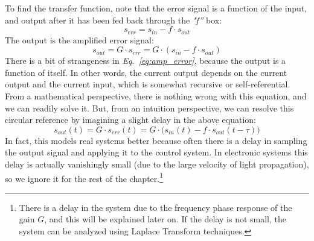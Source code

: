 To find the transfer function, note that the error signal is a function of the input, and output after it has been fed back through the \emph{"f''} box:
    \begin{equation}
        s_{err} = s_{in} - f \cdot s_{out}
    \end{equation}
The output is the amplified error signal:
    \begin{equation}
        s_{out} = G \cdot s_{err} = G \cdot (s_{in} - f \cdot s_{out})
        \label{eq:amp_error}
    \end{equation}
There is a bit of strangeness in \emph{Eq.~\ref{eq:amp_error}},  because the output is a function of itself.  In other words, the current output depends on the current output and the current input, which is somewhat recursive or self-referential.  From a mathematical perspective, there is nothing wrong with this equation, and we can readily solve it.  But, from an intuition perspective, we can resolve this circular reference by imagining a slight delay in the above equation:
    \begin{equation}
        s_{out}(t) = G \cdot s_{err}(t) = G \cdot \big(s_{in}(t) - f \cdot s_{out}(t-\tau)\big)
    \end{equation}
In fact, this models real systems better because often there is a delay in sampling the output signal and applying it to the control system.  In electronic systems this delay is actually vanishingly small (due to the large velocity of light propagation), so we ignore it for the rest of the chapter.\footnote{There is a delay in the system due to the frequency phase response of the gain $G$, and this will be explained later on.  If the delay is not small, the system can be analyzed using Laplace Transform techniques.}  
